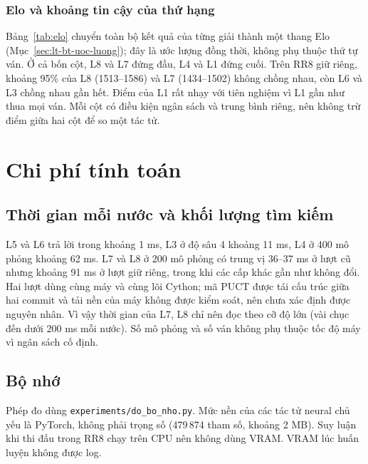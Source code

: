 \subsubsection{Elo và khoảng tin cậy của thứ hạng}
\label{sec:elo}

Bảng~\ref{tab:elo} chuyển toàn bộ kết quả của từng giải thành một thang Elo (Mục~\ref{sec:lt-bt-uoc-luong}); đây là ước lượng đồng thời, không phụ thuộc thứ tự ván. Ở cả bốn cột, L8 và L7 đứng đầu, L4 và L1 đứng cuối. Trên RR8 giữ riêng, khoảng 95\% của L8 (1513--1586) và L7 (1434--1502) không chồng nhau, còn L6 và L3 chồng nhau gần hết. Điểm của L1 rất nhạy với tiên nghiệm vì L1 gần như thua mọi ván. Mỗi cột có điều kiện ngân sách và trung bình riêng, nên không trừ điểm giữa hai cột để so một tác tử.

\section{Chi phí tính toán}
\subsection{Thời gian mỗi nước và khối lượng tìm kiếm}
\label{sec:chi-phi-tg}

L5 và L6 trả lời trong khoảng 1 ms, L3 ở độ sâu 4 khoảng 11 ms, L4 ở 400 mô phỏng khoảng 62 ms. L7 và L8 ở 200 mô phỏng có trung vị 36--37 ms ở lượt cũ nhưng khoảng 91 ms ở lượt giữ riêng, trong khi các cấp khác gần như không đổi. Hai lượt dùng cùng máy và cùng lõi Cython; mã PUCT được tái cấu trúc giữa hai commit và tải nền của máy không được kiểm soát, nên chưa xác định được nguyên nhân. Vì vậy thời gian của L7, L8 chỉ nên đọc theo cỡ độ lớn (vài chục đến dưới 200 ms mỗi nước). Số mô phỏng và số ván không phụ thuộc tốc độ máy vì ngân sách cố định.

\subsection{Bộ nhớ}

Phép đo dùng \texttt{experiments/do\_bo\_nho.py}. Mức nền của các tác tử neural chủ yếu là PyTorch, không phải trọng số (479\,874 tham số, khoảng 2 MB). Suy luận khi thi đấu trong RR8 chạy trên CPU nên không dùng VRAM. VRAM lúc huấn luyện không được log.

